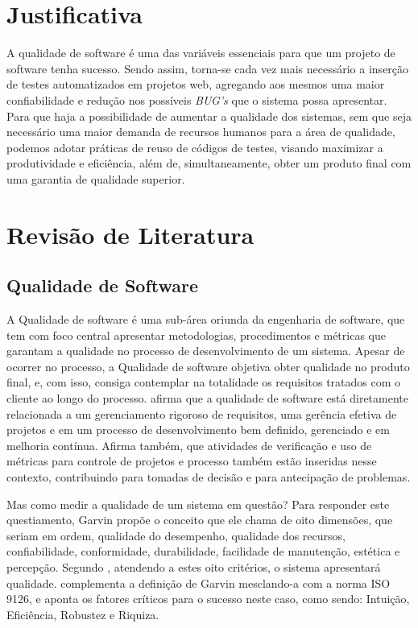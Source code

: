 \documentclass[12pt]{article}
\begin{document}
	\section{Justificativa}
	
	A qualidade de software  é uma das variáveis essenciais para que um projeto de software tenha sucesso.
	Sendo assim, torna-se cada vez mais necessário a inserção de testes automatizados em projetos web,
	agregando aos mesmos uma maior confiabilidade e redução nos possíveis \emph{BUG's} que o sistema possa
	apresentar. Para que haja a possibilidade de aumentar a qualidade dos sistemas, sem que seja necessário uma maior
	demanda de recursos humanos para a área de qualidade, podemos adotar práticas de reuso de códigos de testes, visando
	maximizar a produtividade e eficiência, além de, simultaneamente, obter um produto final com uma garantia de qualidade
	superior.
	
	\section{Revisão de Literatura}
	
	\subsection{Qualidade de Software}
	
	A Qualidade de software é uma sub-área oriunda da engenharia de software, que tem com foco central apresentar metodologias,
	procedimentos e métricas que garantam a qualidade no processo de desenvolvimento de um sistema. Apesar de ocorrer no processo, a Qualidade de software
	objetiva obter qualidade no produto final, e, com isso, consiga contemplar na totalidade os requisitos tratados com o cliente ao longo do processo.
    \citeauthor{de2006introduccao} \cite{de2006introduccao} afirma que a qualidade de software está diretamente relacionada a um gerenciamento
    rigoroso de requisitos, uma gerência efetiva de projetos e em um processo de desenvolvimento bem definido, gerenciado e em melhoria contínua. Afirma também,
    que atividades de verificação e uso de métricas para controle de projetos e processo também estão inseridas nesse contexto, contribuindo para tomadas de
    decisão e para antecipação de problemas.

    Mas como medir a qualidade de um sistema em questão? Para responder este questiamento, Garvin \cite{garvin1987competing} propõe o conceito que ele chama de
    oito dimensões, que seriam em ordem, qualidade do desempenho, qualidade dos recursos, confiabilidade, conformidade, durabilidade, facilidade de manutenção,
    estética e percepção. Segundo \citeauthor{garvin1987competing}, atendendo a estes oito critérios, o sistema apresentará qualidade.
    \citeauthor{pressman2011engenharia} \cite{pressman2011engenharia} complementa a definição de Garvin mesclando-a com a norma ISO 9126, e aponta os fatores
    críticos para o sucesso neste caso, como sendo: Intuição, Eficiência, Robustez e Riquiza.
\end{document}
